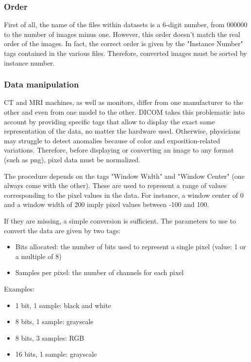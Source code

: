 \subsubsection{Order}
First of all, the name of the files within datasets is a 6-digit number, from 000000 to the number of images minus one. However, this order doesn’t match the real order of the images. In fact, the correct order is given by the "Instance Number" tags contained in the various files. Therefore, converted images must be sorted by instance number. 

\subsubsection{Data manipulation}
\label{sec:dicom_data_manipulation}
CT and MRI machines, as well as monitors, differ from one manufacturer to the other and even from one model to the other. DICOM takes this problematic into account by providing specific tags that allow to display the exact same representation of the data, no matter the hardware used. Otherwise, physicians may struggle to detect anomalies because of color and exposition-related variations. 
Therefore, before displaying or converting an image to any format (such as png), pixel data must be normalized. 

The procedure depends on the tags "Window Width" and "Window Center" (one always come with the other). These are used to represent a range of values corresponding to the pixel values in the data. For instance, a window center of 0 and a window width of 200 imply pixel values between -100 and 100. 

If they are missing, a simple conversion is sufficient. The parameters to use to convert the data are given by two tags: 
\begin{itemize}
	\item Bits allocated: the number of bits used to represent a single pixel (value: 1 or a multiple of 8)
	\item Samples per pixel: the number of channels for each pixel

\end{itemize}

\noindent Examples: 
\begin{itemize}
\item 1 bit, 1 sample: black and white
\item 8 bits, 1 sample: grayscale
\item 8 bits, 3 samples: RGB
\item 16 bits, 1 sample: grayscale

\end{itemize} 

